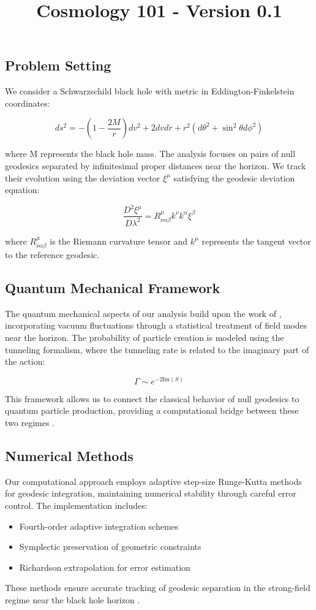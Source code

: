 \documentclass{article}\usepackage{graphicx} \usepackage{amsmath} \usepackage{colortbl}\title{Cosmology 101 - Version 0.1}
\begin{document}
\subsection{Problem Setting}
We consider a Schwarzschild black hole with metric in Eddington-Finkelstein coordinates:

\begin{equation}
ds^2 = -(1-\frac{2M}{r})dv^2 + 2dvdr + r^2(d\theta^2 + \sin^2\theta d\phi^2)
\end{equation}

where M represents the black hole mass. The analysis focuses on pairs of null geodesics separated by infinitesimal proper distances near the horizon. We track their evolution using the deviation vector $\xi^\mu$ satisfying the geodesic deviation equation:

\begin{equation}
\frac{D^2\xi^\mu}{D\lambda^2} = R^\mu_{\nu\alpha\beta}k^\nu k^\alpha \xi^\beta
\end{equation}

where $R^\mu_{\nu\alpha\beta}$ is the Riemann curvature tensor and $k^\mu$ represents the tangent vector to the reference geodesic.

\subsection{Quantum Mechanical Framework}
The quantum mechanical aspects of our analysis build upon the work of \cite{unruh1981}, incorporating vacuum fluctuations through a statistical treatment of field modes near the horizon. The probability of particle creation is modeled using the tunneling formalism, where the tunneling rate \Gamma is related to the imaginary part of the action:

\begin{equation}
\Gamma \sim e^{-2\text{Im}(S)}
\end{equation}

This framework allows us to connect the classical behavior of null geodesics to quantum particle production, providing a computational bridge between these two regimes \cite{bekenstein1973}.

\subsection{Numerical Methods}
Our computational approach employs adaptive step-size Runge-Kutta methods for geodesic integration, maintaining numerical stability through careful error control. The implementation includes:

\begin{itemize}
\item Fourth-order adaptive integration schemes
\item Symplectic preservation of geometric constraints
\item Richardson extrapolation for error estimation
\end{itemize}

These methods ensure accurate tracking of geodesic separation in the strong-field regime near the black hole horizon \cite{visser1998}.
\end{document}
